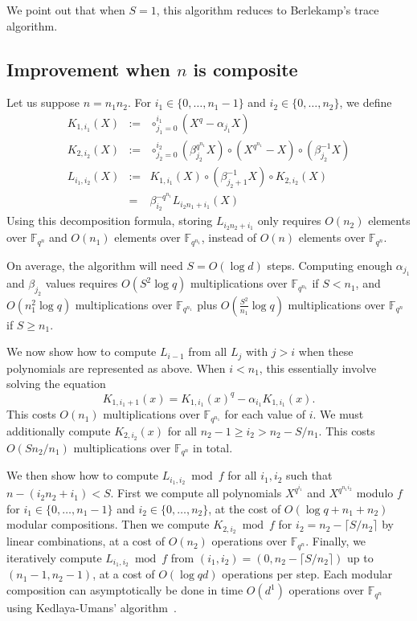 \documentclass{sig-alternate}
\newcommand{\qq}{q}
\newcommand{\nn}{n}
\newcommand{\qn}{{\qq^\nn}}
\newcounter{algo}
\begin{document}
We point out that when $S=1$, this algorithm reduces to Berlekamp's trace algorithm.


\subsection{Improvement when $n$ is composite}

Let us suppose $n=n_1n_2$. For $i_1\in\{0,\ldots,n_1-1\}$ and $i_2\in\{0,\ldots,n_2\}$, we define 
\begin{eqnarray*}
K_{1,i_1}(X)&:=&\circ_{j_1=0}^{i_1} (X^{\qq}-\alpha_{j_1} X)\\
K_{2,i_2}(X)&:=&\circ_{j_2=0}^{i_2} (\beta_{j_2}^{\qq^{n_1}} X)  \circ  (X^{\qq^{n_1}}-X) \circ (\beta_{j_2}^{-1}  X)\\
L_{i_1,i_2}(X)&:=&K_{1,i_1}(X)\circ(\beta_{j_2+1}^{-1}  X)\circ K_{2,i_2}(X)\\
&=&\beta_{i_2}^{-q^{n_1}}L_{i_2n_1+i_1}(X)
\end{eqnarray*}
Using this decomposition formula, storing $L_{i_2n_2+i_1}$ only requires $O(n_2)$ elements over $\mathbb{F}_{\qn}$ and $O(n_1)$ elements over $\mathbb{F}_{\qq^{n_1}}$, instead of $O(n)$ elements over $\mathbb{F}_{\qn}$. 

On average, the algorithm will need $S=O(\log d)$ steps. Computing enough $\alpha_{j_1}$ and $\beta_{j_2}$ values requires $O(S^2\log q)$ multiplications over $\mathbb{F}_{\qq^{n_1}}$ if $S<n_1$, and $O(n_1^2\log q)$ multiplications over $\mathbb{F}_{\qq^{n_1}}$ plus $O\left(\frac{S^2}{n_1}\log \qq\right)$ multiplications over $\mathbb{F}_{\qn}$ if $S\geq n_1$.

We now show how to compute $L_{i-1}$ from all $L_j$ with $j>i$ when these polynomials are represented as above. When $i<n_1$, this essentially involve solving the equation 
$$K_{1,i_1+1}(x)=K_{1,i_1}(x)^q-\alpha_{i_1}K_{1,i_1}(x).$$
This costs $O(n_1)$ multiplications over $\mathbb{F}_{\qq^{n_1}}$ for each value of $i$.
%
We must additionally compute $K_{2,i_2}(x)$ for all $n_2-1\geq i_2>n_2-S/n_1$. This costs $O(Sn_2/n_1)$ multiplications over $\mathbb{F}_{\qq^{n}}$ in total.

We then show how to compute $L_{i_1,i_2}\bmod f$ for all $i_1,i_2$ such that $n-(i_2n_2+i_1)<S$. First we compute all polynomials $X^{q^{i_1}}$ and $X^{q^{n_1i_2}}$ modulo $f$ for $i_1\in\{0,\ldots,n_1-1\}$ and $i_2\in\{0,\ldots,n_2\}$, at the cost of $O(\log q+n_1+n_2)$ modular compositions.
Then we compute $K_{2,i_2}\bmod f$ for $i_2=n_2-\lceil S/n_2\rceil$ by linear combinations, at a cost of $O(n_2)$ operations over $\mathbb{F}_{\qn}$. Finally, we iteratively compute $L_{i_1,i_2}\bmod f$ from $(i_1,i_2)=(0,n_2-\lceil S/n_2\rceil)$ up to $(n_1-1,n_2-1)$, at a cost of $O(\log q d)$ operations per step.
%
Each modular composition can asymptotically be done in time $O(d^{1})$ operations over $\mathbb{F}_{\qn}$ using Kedlaya-Umans' algorithm~\cite{}.
\end{document}
